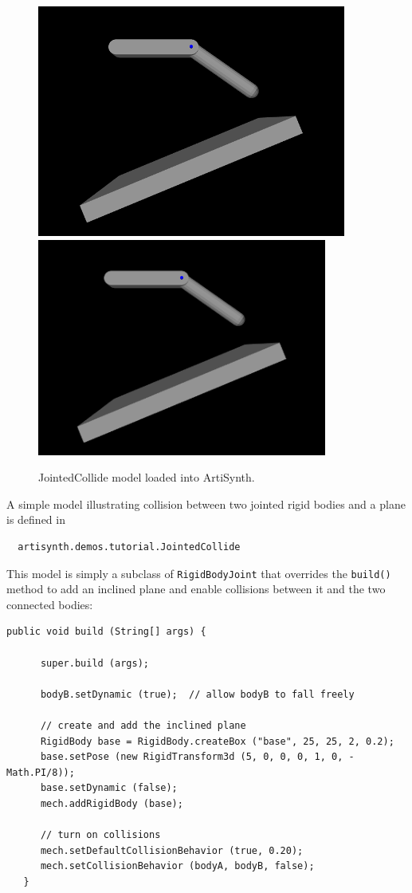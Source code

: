 \begin{figure}[ht]
\begin{center}
\iflatexml
 \includegraphics[]{images/JointedCollide}
\else
 \includegraphics[width=3.75in]{images/JointedCollide}
\fi
\end{center}
\caption{JointedCollide model loaded into ArtiSynth.}
\label{JointedCollide:fig}
\end{figure}

A simple model illustrating collision between two jointed rigid bodies
and a plane is defined in
%
\begin{verbatim}
  artisynth.demos.tutorial.JointedCollide
\end{verbatim}
%

This model is simply a subclass of {\tt RigidBodyJoint} that
overrides the {\tt build()} method 
to add an inclined plane and enable collisions between it and
the two connected bodies:
%
\lstset{numbers=left}
\begin{lstlisting}[]
   public void build (String[] args) {

      super.build (args);

      bodyB.setDynamic (true);  // allow bodyB to fall freely

      // create and add the inclined plane
      RigidBody base = RigidBody.createBox ("base", 25, 25, 2, 0.2);
      base.setPose (new RigidTransform3d (5, 0, 0, 0, 1, 0, -Math.PI/8));
      base.setDynamic (false);
      mech.addRigidBody (base);

      // turn on collisions
      mech.setDefaultCollisionBehavior (true, 0.20);
      mech.setCollisionBehavior (bodyA, bodyB, false);
   }
\end{lstlisting}
\lstset{numbers=none}

